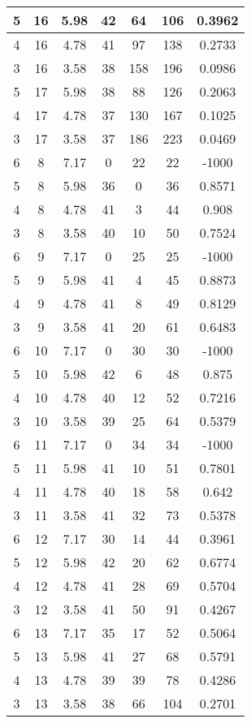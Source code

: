 \documentclass[letterpaper, 12pt]{article}
\begin{document}
\begin{longtable}{|c|c|c|c|c|c|c|}
\hline
5 & 16 & 5.98 & 42 & 64 & 106 & 0.3962 \\
\hline
4 & 16 & 4.78 & 41 & 97 & 138 & 0.2733 \\
\hline
3 & 16 & 3.58 & 38 & 158 & 196 & 0.0986 \\
\hline
5 & 17 & 5.98 & 38 & 88 & 126 & 0.2063 \\
\hline
4 & 17 & 4.78 & 37 & 130 & 167 & 0.1025 \\
\hline
3 & 17 & 3.58 & 37 & 186 & 223 & 0.0469 \\
\hline
6 & 8 & 7.17 & 0 & 22 & 22 & -1000 \\
\hline
5 & 8 & 5.98 & 36 & 0 & 36 & 0.8571 \\
\hline
4 & 8 & 4.78 & 41 & 3 & 44 & 0.908 \\
\hline
3 & 8 & 3.58 & 40 & 10 & 50 & 0.7524 \\
\hline
6 & 9 & 7.17 & 0 & 25 & 25 & -1000 \\
\hline
5 & 9 & 5.98 & 41 & 4 & 45 & 0.8873 \\
\hline
4 & 9 & 4.78 & 41 & 8 & 49 & 0.8129 \\
\hline
3 & 9 & 3.58 & 41 & 20 & 61 & 0.6483 \\
\hline
6 & 10 & 7.17 & 0 & 30 & 30 & -1000 \\
\hline
5 & 10 & 5.98 & 42 & 6 & 48 & 0.875 \\
\hline
4 & 10 & 4.78 & 40 & 12 & 52 & 0.7216 \\
\hline
3 & 10 & 3.58 & 39 & 25 & 64 & 0.5379 \\
\hline
6 & 11 & 7.17 & 0 & 34 & 34 & -1000 \\
\hline
5 & 11 & 5.98 & 41 & 10 & 51 & 0.7801 \\
\hline
4 & 11 & 4.78 & 40 & 18 & 58 & 0.642 \\
\hline
3 & 11 & 3.58 & 41 & 32 & 73 & 0.5378 \\
\hline
6 & 12 & 7.17 & 30 & 14 & 44 & 0.3961 \\
\hline
5 & 12 & 5.98 & 42 & 20 & 62 & 0.6774 \\
\hline
4 & 12 & 4.78 & 41 & 28 & 69 & 0.5704 \\
\hline
3 & 12 & 3.58 & 41 & 50 & 91 & 0.4267 \\
\hline
6 & 13 & 7.17 & 35 & 17 & 52 & 0.5064 \\
\hline
5 & 13 & 5.98 & 41 & 27 & 68 & 0.5791 \\
\hline
4 & 13 & 4.78 & 39 & 39 & 78 & 0.4286 \\
\hline
3 & 13 & 3.58 & 38 & 66 & 104 & 0.2701 \\

\end{longtable}
\end{document}
